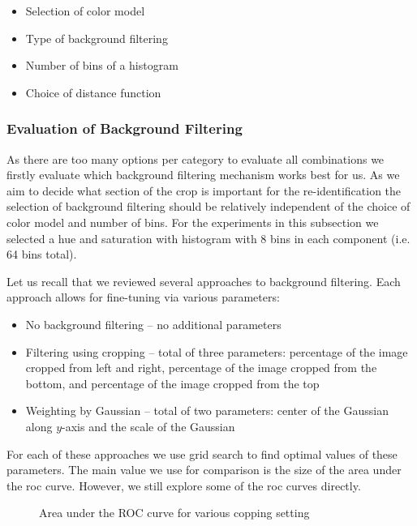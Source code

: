 \begin{itemize}
    \item Selection of color model
    \item Type of background filtering
    \item Number of bins of a histogram
    \item Choice of distance function
\end{itemize}

\subsubsection{Evaluation of Background Filtering}

As there are too many options per category to evaluate all combinations we
firstly evaluate which background filtering mechanism works best for us. As we
aim to decide what section of the crop is important for the re-identification
the selection of background filtering should be relatively independent of
the choice of color model and number of bins. For the experiments in this
subsection we selected a hue and saturation with histogram with 8 bins in
each component (i.e. 64 bins total).

Let us recall that we reviewed several approaches to background filtering.
Each approach allows for fine-tuning via various parameters:

\begin{itemize}
    \item No background filtering -- no additional parameters
    \item Filtering using cropping -- total of three parameters: percentage of the image cropped from left and right, percentage of the image cropped from the bottom, and percentage of the image cropped from the top
    \item Weighting by Gaussian -- total of two parameters: center of the Gaussian along $y$-axis and the scale of the Gaussian
\end{itemize}

For each of these approaches we use grid search to find optimal values of
these parameters. The main value we use for comparison is the size of the
area under the \gls{roc} curve. However, we still explore some of the
\gls{roc} curves directly.

\begin{figure}
    \centering
    \def\svgwidth{\columnwidth}
    \Large
    \scalebox{0.6}{}
    \scalebox{0.6}{}
    \scalebox{0.6}{}
    \caption{Area under the ROC curve for various copping setting}
    \label{fig:aoc_crop}
\end{figure}

